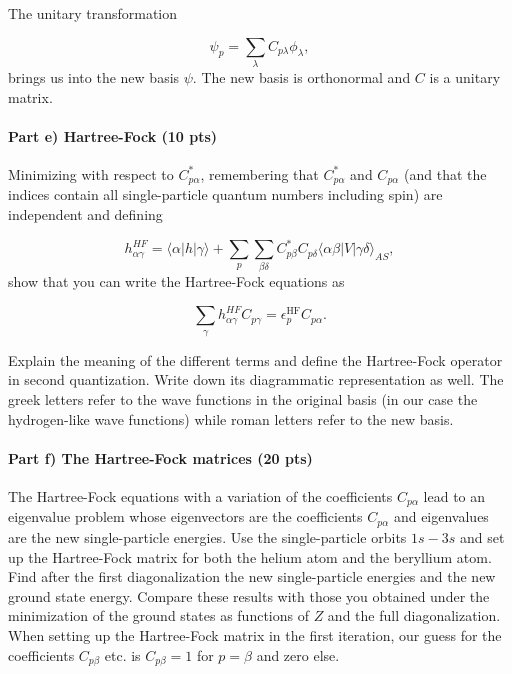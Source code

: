 \documentclass[a4wide,10pt]{article}
\begin{document}
The unitary transformation

\begin{equation*}
\psi_p  = \sum_{\lambda} C_{p\lambda}\phi_{\lambda},
\end{equation*}
brings us into the new basis $\psi$.  The new basis is orthonormal and $C$ is a unitary matrix.

\paragraph{Part e) Hartree-Fock (10 pts)}
Minimizing with respect to $C^*_{p\alpha}$, remembering that
$C^*_{p\alpha}$ and $C_{p\alpha}$ (and that the indices contain all
single-particle quantum numbers including spin) are independent and
defining

\begin{equation*}
h_{\alpha\gamma}^{HF}=\langle \alpha | h | \gamma \rangle+
\sum_{p}\sum_{\beta\delta} C^*_{p\beta}C_{p\delta}\langle \alpha\beta|V|\gamma\delta\rangle_{AS},
\end{equation*}
show that you can write the Hartree-Fock  equations as

\begin{equation*}
\sum_{\gamma}h_{\alpha\gamma}^{HF}C_{p\gamma}=\epsilon_p^{\mathrm{HF}}C_{p\alpha}.
\label{eq:newhf}
\end{equation*}

Explain the meaning of the different terms and define the Hartree-Fock
operator in second quantization. Write down its diagrammatic
representation as well.  The greek letters refer to the wave functions
in the original basis (in our case the hydrogen-like wave functions)
while roman letters refer to the new basis.

\paragraph{Part f) The Hartree-Fock matrices (20 pts)}
The Hartree-Fock equations with a variation of the coefficients
$C_{p\alpha}$ lead to an eigenvalue problem whose eigenvectors are the
coefficients $C_{p\alpha}$ and eigenvalues are the new single-particle
energies.  Use the single-particle orbits $1s-3s$ and set up the
Hartree-Fock matrix for both the helium atom and the beryllium
atom. Find after the first diagonalization the new single-particle
energies and the new ground state energy.  Compare these results with
those you obtained under the minimization of the ground states as
functions of $Z$ and the full diagonalization. When setting up the
Hartree-Fock matrix in the first iteration, our guess for the
coefficients $C_{p\beta}$ etc. is $C_{p\beta}=1$ for $p=\beta$ and
zero else.
\end{document}
